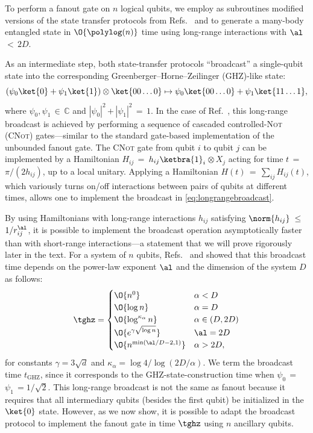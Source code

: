 To perform a fanout gate on $n$ logical qubits, we
employ as subroutines modified versions of the state transfer protocols from Refs.~\cite{Eldredge2017} and \cite{Tran2021a} to generate a many-body entangled state in $\O{\polylog(n)}$ time using long-range interactions with $\al$\,$<$\,$2D$.

As an intermediate step, both state-transfer protocols ``broadcast'' a single-qubit state into the corresponding Greenberger–Horne–Zeilinger (GHZ)-like state:
\begin{equation}
    \label{eq:longrangebroadcast}
	(\psi_0 \ket{0} + \psi_1 \ket{1})\otimes \ket{0 0 \dots 0} \mapsto \psi_0 \ket{0 0  \dots 0} + \psi_1 \ket{1 1 \dots 1},
\end{equation}
where $\psi_0, \psi_1$\,$\in$\,$\mathbb{C}$ and $|\psi_0|^2$\,$+$\,$|\psi_1|^2$\,$=$\,$1$.
In the case of Ref.~\cite{Eldredge2017}, this long-range broadcast is achieved by performing a sequence of cascaded controlled-\textsc{Not} (\textsc{CNot}) gates---similar to the standard gate-based implementation of the unbounded fanout gate.
The \textsc{CNot} gate from qubit $i$ to qubit $j$ can be implemented by a Hamiltonian $H_{ij}$\,$=$\,$h_{ij} \ketbra{1}_i$\,$\otimes$\,$X_j$ acting for time $t$\,$=$\,$\pi/(2h_{ij})$, up to a local unitary.
Applying a Hamiltonian $H(t)$\,$=$\,$\sum_{ij} H_{ij}(t)$, which variously turns on/off interactions between pairs of qubits at different times, allows one to implement the broadcast in \cref{eq:longrangebroadcast}.

By using Hamiltonians with long-range interactions $h_{ij}$ satisfying $\norm{h_{ij}}$\,$\le$\,$1/r_{ij}^\al$, it is possible to implement the broadcast operation asymptotically faster than with short-range interactions---a statement that we will prove rigorously later in the text.
For a system of $n$ qubits, Refs.~\cite{Eldredge2017} and \cite{Tran2021a} showed that this broadcast time depends on the power-law exponent $\al$ and the dimension of the system $D$ as follows:
\begin{equation}
\label{eq:statetransfertimes_new}
	\tghz =
  \begin{cases}
    \O{n^0} & \alpha < D
    \\ \O{\log n} & \alpha = D
    \\ \O{\log^{\kappa_\alpha} n }& \alpha \in (D,2D)
    \\ \O{e^{\gamma\sqrt{\log n}}}& \al = 2D
    \\ \O{n^{\min(\al/D - 2,1)}} & \alpha > 2D,
  \end{cases}
\end{equation}
for constants $\gamma = 3\sqrt{d}$ and $\kappa_\alpha = \log 4/\log(2D/\alpha)$.
We term the broadcast time $t_{\text{GHZ}}$, since it corresponds to the GHZ-state-construction time when $\psi_0$\,$=$\,$\psi_1$\,$=1/\sqrt{2}$.
This long-range broadcast is not the same as fanout because it requires that all intermediary qubits (besides the first qubit) be initialized in the $\ket{0}$ state.
However, as we now show, it is possible to adapt the broadcast protocol to implement the fanout gate in time $\tghz$ using $n$ ancillary qubits.

